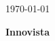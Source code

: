 
\begin{titlepage}
    \centering
    \vspace*{4cm}
    {\Huge\bfseries \thetitle \par}
    \vspace{1.5cm}
    {\Large \theauthor \par}
    \vspace{0.5cm}
    {\large \today \par}
    \vfill
    {\Large \textbf{Innovista}}
\end{titlepage}

